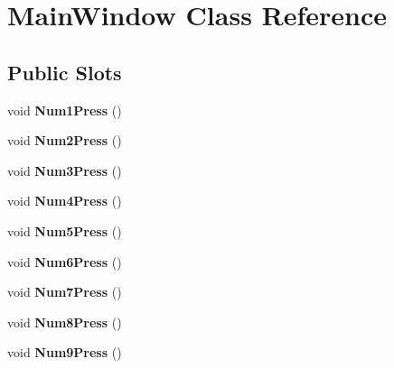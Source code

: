 \hypertarget{class_main_window}{\section{Main\-Window Class Reference}
\label{class_main_window}
}
\subsection*{Public Slots}
\begin{DoxyCompactItemize}
\item 
\hypertarget{class_main_window_a85c6273206499c1a041b6d532b2224d5}{void {\bfseries Num1\-Press} ()}\label{class_main_window_a85c6273206499c1a041b6d532b2224d5}

\item 
\hypertarget{class_main_window_a29719cefd3c330c215fd445d28f160c1}{void {\bfseries Num2\-Press} ()}\label{class_main_window_a29719cefd3c330c215fd445d28f160c1}

\item 
\hypertarget{class_main_window_a87992b9459776c9a888552d50c5f056f}{void {\bfseries Num3\-Press} ()}\label{class_main_window_a87992b9459776c9a888552d50c5f056f}

\item 
\hypertarget{class_main_window_a30a12a00bf2e07572f4246689c0f28fd}{void {\bfseries Num4\-Press} ()}\label{class_main_window_a30a12a00bf2e07572f4246689c0f28fd}

\item 
\hypertarget{class_main_window_a3c7fbf12f84ed2f3626110f916b0b2ae}{void {\bfseries Num5\-Press} ()}\label{class_main_window_a3c7fbf12f84ed2f3626110f916b0b2ae}

\item 
\hypertarget{class_main_window_adbce6964b135381217ecb1743d3e4aa9}{void {\bfseries Num6\-Press} ()}\label{class_main_window_adbce6964b135381217ecb1743d3e4aa9}

\item 
\hypertarget{class_main_window_ae6f603a01e255e33224db1b19b78759f}{void {\bfseries Num7\-Press} ()}\label{class_main_window_ae6f603a01e255e33224db1b19b78759f}

\item 
\hypertarget{class_main_window_a6e87ab64100597c39f816aa98b13b0ac}{void {\bfseries Num8\-Press} ()}\label{class_main_window_a6e87ab64100597c39f816aa98b13b0ac}

\item 
\hypertarget{class_main_window_a0a93067c07a5b7c7db871328cc0c902d}{void {\bfseries Num9\-Press} ()}\label{class_main_window_a0a93067c07a5b7c7db871328cc0c902d}


\end{DoxyCompactItemize}
